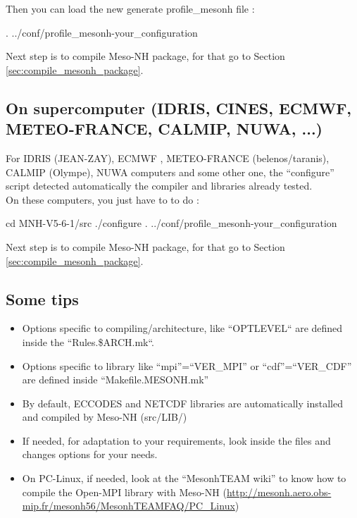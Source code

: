 Then you can load the new generate profile\_mesonh file :
\begin{bashcode}
. ../conf/profile_mesonh-your_configuration
\end{bashcode}

Next step is to compile Meso-NH package, for that go to Section \ref{sec:compile_mesonh_package}.

\subsection{On supercomputer (IDRIS, CINES, ECMWF, METEO-FRANCE, CALMIP, NUWA, ...)}

For IDRIS (JEAN-ZAY), ECMWF , METEO-FRANCE (belenos/taranis), CALMIP (Olympe), NUWA computers and some other one, the ``configure'' script detected automatically the compiler and libraries already tested. \\

On these computers, you just have to to do :
\begin{bashcode}
 cd MNH-V5-6-1/src
 ./configure
 . ../conf/profile_mesonh-your_configuration
 \end{bashcode}

Next step is to compile Meso-NH package, for that go to Section \ref{sec:compile_mesonh_package}.
 
\subsection{Some tips}

\begin{itemize}
\item Options specific to compiling/architecture, like ``OPTLEVEL`` are defined inside the ``Rules.\${ARCH}.mk``.
\item Options specific to library like ``mpi''=``VER\_MPI'' or ``cdf''=``VER\_CDF'' are defined inside ``Makefile.MESONH.mk''
\item By default, ECCODES and NETCDF libraries are automatically installed and compiled by Meso-NH (src/LIB/)
\item If needed, for adaptation to your requirements, look inside the files and changes options for your needs.
\item On PC-Linux, if needed, look at the ``MesonhTEAM wiki'' to know how to compile the Open-MPI library with Meso-NH (\href{http://mesonh.aero.obs-mip.fr/mesonh56/MesonhTEAMFAQ/PC_Linux}{http://mesonh.aero.obs-mip.fr/mesonh56/MesonhTEAMFAQ/PC\_Linux})
 \end{itemize}

 